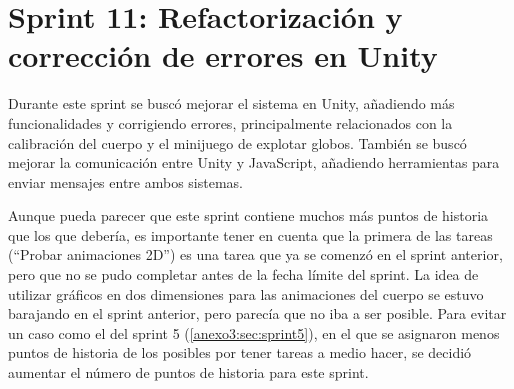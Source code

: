 

\section{Sprint 11: Refactorización y corrección de errores en Unity}
\label{anexo3:sec:sprint11}

Durante este sprint se buscó mejorar el sistema en Unity, añadiendo más funcionalidades y corrigiendo
errores, principalmente relacionados con la calibración del cuerpo y el minijuego de explotar globos.
También se buscó mejorar la comunicación entre Unity y JavaScript, añadiendo herramientas para enviar
mensajes entre ambos sistemas.

Aunque pueda parecer que este sprint contiene muchos más puntos de historia que los que debería,
es importante tener en cuenta que la primera de las tareas (\enquote{Probar animaciones 2D}) es
una tarea que ya se comenzó en el sprint anterior, pero que no se pudo completar antes de la fecha
límite del sprint. La idea de utilizar gráficos en dos dimensiones para las animaciones del cuerpo
se estuvo barajando en el sprint anterior, pero parecía que no iba a ser posible. Para evitar un caso
como el del sprint 5 (\ref{anexo3:sec:sprint5}), en el que se asignaron menos puntos de historia de
los posibles por tener tareas a medio hacer, se decidió aumentar el número de puntos de historia
para este sprint.


